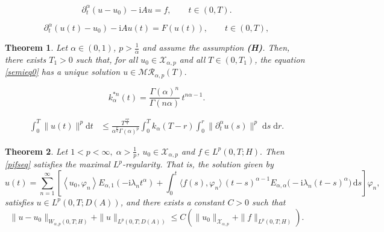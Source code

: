 \documentclass[10pt,a4paper]{amsart}
\newtheorem{theorem}{Theorem}
\def \d {\mathrm{d}}
\begin{document}
\begin{equation}\label{pifseq}
\partial_t^\alpha (u-u_0) -\mathrm{i} Au=f, \qquad t \in (0,T).
\end{equation}

\begin{equation}\label{semieq0}
\partial_t^\alpha (u(t)-u_0) -\mathrm{i} Au(t)=F(u(t)), \qquad t \in (0,T),
\end{equation}

\begin{theorem}\label{ThmAch}
Let $\alpha\in (0,1)$, $p>\frac{1}{\alpha}$ and assume the assumption \textbf{(H)}. Then, there exists $T_1>0$ such that, for all $u_0\in \mathcal{X}_{\alpha,p}$ and all $T\in (0,T_1)$, the equation \eqref{semieq0} has a unique solution $u\in \mathcal{M}\mathcal{R}_{\alpha,p}(T).$ %
\end{theorem}

\begin{equation}
    k_\alpha^{*n}(t)
= \frac{\Gamma(\alpha)^n}{\Gamma(n\alpha)}\, t^{n\alpha-1}. \label{n_convolution}
\end{equation}

    \begin{align}
		\int_0^T \|u(t)\|^p\d t
		&\le \frac{T^{\frac{\alpha p}{q}}}{\alpha^{\frac{p}{q}}\Gamma(\alpha)^p}\int^T_0 k_{\alpha}(T-r)
		\int_0^r\|\partial_t^\alpha u(s)\|^p\;\d s\;\d r. \label{lm:semi}
	\end{align}

\begin{theorem}\label{pithmMR}
Let $1<p<\infty, \; \alpha >\frac{1}{p}$, $u_0\in \mathcal{X}_{\alpha,p}$ and $f\in L^p(0,T;H).$ Then \eqref{pifseq} satisfies the maximal $L^p$-regularity. That is, the solution given by
\begin{equation*}
u(t)=\sum_{n=1}^{\infty}\left[\left\langle u_0, \varphi_n\right\rangle E_{\alpha, 1}\left(-\mathrm{i} \lambda_n t^\alpha\right) + \int_0^t \langle f(s),\varphi_n\rangle\,(t-s)^{\alpha-1}E_{\alpha,\alpha}\big(-\mathrm{i}\lambda_n (t-s)^\alpha\big)\,\d s \right]\varphi_n,
\end{equation*}
satisfies $u\in L^p(0,T;D(A))$, and there exists a constant $C>0$ such that
\[
\|u-u_0\|_{W_{\alpha,p}(0,T;H)} + \|u\|_{L^p(0,T;D(A))}\le C\left(\|u_0\|_{\mathcal{X}_{\alpha,p}}+\|f\|_{L^p(0,T;H)}\right).
\]
\end{theorem}
\end{document}
